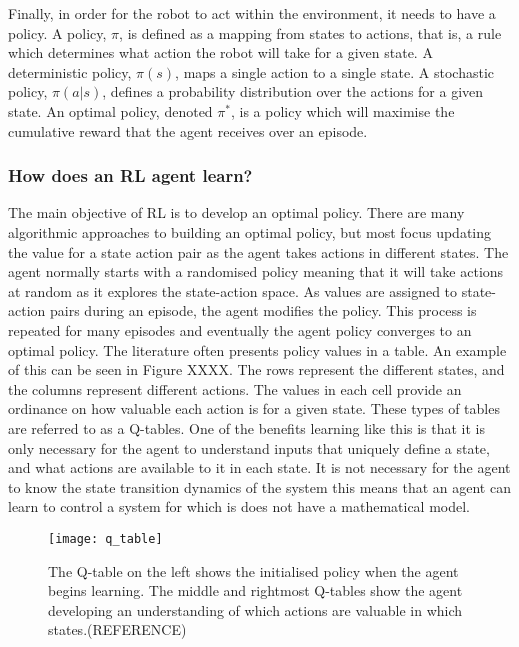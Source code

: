 Finally, in order for the robot to act within the environment, it needs to have a policy. A policy, $\pi$, is defined as a mapping from states to actions, that is, a rule which determines what action the robot will take for a given state. A deterministic policy, $\pi (s)$, maps a single action to a single state. A stochastic policy, $\pi (a | s)$, defines a probability distribution over the actions for a given state. An optimal policy, denoted $\pi^*$, is a policy which will maximise the cumulative reward that the agent receives over an episode.

\subsubsection{How does an RL agent learn?}
The main objective of RL is to develop an optimal policy. There are many algorithmic approaches to building an optimal policy, but most focus updating the value for a state action pair as the agent takes actions in different states. The agent normally starts with a randomised policy meaning that it will take actions at random as it explores the state-action space. As values are assigned to state-action pairs during an episode, the agent modifies the policy. This process is repeated for many episodes and eventually the agent policy converges to an optimal policy. The literature often presents policy values in a table. An example of this can be seen in Figure XXXX. The rows represent the different states, and the columns represent different actions. The values in each cell provide an ordinance on how valuable each action is for a given state. These types of tables are referred to as a Q-tables. One of the benefits learning like this is that it is only necessary for the agent to understand inputs that uniquely define a state, and what actions are available to it in each state. It is not necessary for the agent to know the state transition dynamics of the system this means that an agent can learn to control a system for which is does not have a mathematical model.
\begin{figure}[ht]
	\centering
	\texttt{[image: q\_table]}
	\caption{The Q-table on the left shows the initialised policy when the agent begins learning. The middle and rightmost Q-tables show the agent developing an understanding of which actions are valuable in which states.(REFERENCE)}
\end{figure}

